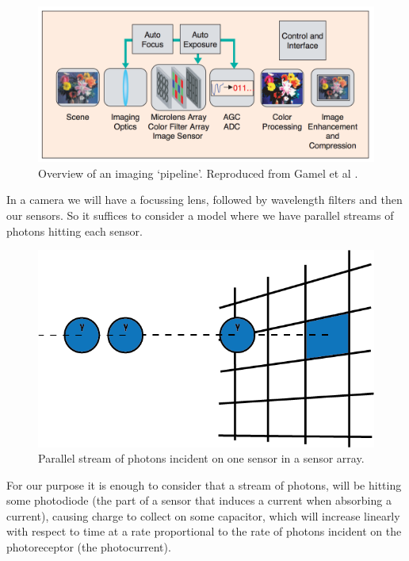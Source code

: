 \documentclass[12pt,twoside,notitlepage]{report}
\begin{document}
            \begin{figure}[H]
                \centering
                \includegraphics[scale=0.30]{imaging_pipeline}
                \caption{Overview of an imaging `pipeline'. Reproduced from Gamel et al \cite{gamal2005cmos}.}
                \label{fig:image_pipeline}
            \end{figure}

            In a camera we will have a focussing lens, followed by wavelength filters and then our sensors. So it 
            suffices to consider a model where we have parallel streams of photons hitting each sensor.

            \begin{figure}[H]
                \centering
                \includegraphics[scale=0.5]{photon_stream}
                \caption{Parallel stream of photons incident on one sensor in a sensor array.}
                \label{fig:photon_stream}
            \end{figure}

            For our purpose it is enough to consider that a stream of photons, will be hitting some photodiode (the 
            part of a sensor that induces a current when absorbing a current), causing charge to collect on some 
            capacitor, which will increase linearly with respect to time at a rate proportional to the rate of photons 
            incident on the photoreceptor (the photocurrent). \cite{gamal2005cmos}
\end{document}
